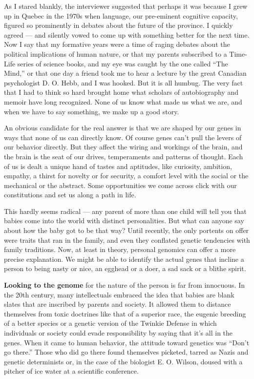 As I stared blankly, the interviewer suggested that perhaps it was
because I grew up in Quebec in the 1970s when language, our pre-eminent
cognitive capacity, figured so prominently in debates about the future
of the province. I quickly agreed --- and silently vowed to come up with
something better for the next time. Now I say that my formative years
were a time of raging debates about the political implications of human
nature, or that my parents subscribed to a Time-Life series of science
books, and my eye was caught by the one called ``The Mind,'' or that one
day a friend took me to hear a lecture by the great Canadian
psychologist D. O. Hebb, and I was hooked. But it is all humbug. The
very fact that I had to think so hard brought home what scholars of
autobiography and memoir have long recognized. None of us know what made
us what we are, and when we have to say something, we make up a good
story.

An obvious candidate for the real answer is that we are shaped by our
genes in ways that none of us can directly know. Of course genes can't
pull the levers of our behavior directly. But they affect the wiring and
workings of the brain, and the brain is the seat of our drives,
temperaments and patterns of thought. Each of us is dealt a unique hand
of tastes and aptitudes, like curiosity, ambition, empathy, a thirst for
novelty or for security, a comfort level with the social or the
mechanical or the abstract. Some opportunities we come across click with
our constitutions and set us along a path in life.

This hardly seems radical --- any parent of more than one child will
tell you that babies come into the world with distinct personalities.
But what can anyone say about how the baby got to be that way? Until
recently, the only portents on offer were traits that ran in the family,
and even they conflated genetic tendencies with family traditions. Now,
at least in theory, personal genomics can offer a more precise
explanation. We might be able to identify the actual genes that incline
a person to being nasty or nice, an egghead or a doer, a sad sack or a
blithe spirit.

\textbf{Looking to the genome} for the nature of the person is far from
innocuous. In the 20th century, many intellectuals embraced the idea
that babies are blank slates that are inscribed by parents and society.
It allowed them to distance themselves from toxic doctrines like that of
a superior race, the eugenic breeding of a better species or a genetic
version of the Twinkie Defense in which individuals or society could
evade responsibility by saying that it's all in the genes. When it came
to human behavior, the attitude toward genetics was ``Don't go there.''
Those who did go there found themselves picketed, tarred as Nazis and
genetic determinists or, in the case of the biologist E. O. Wilson,
doused with a pitcher of ice water at a scientific conference.

